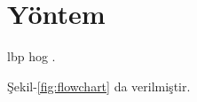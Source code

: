 



 



\section{Yöntem}


\lipsum[14-16]
\acrshort{lbp} \acrshort{hog} .


\lipsum[18-20] Şekil-\ref{fig:flowchart} da verilmiştir.


